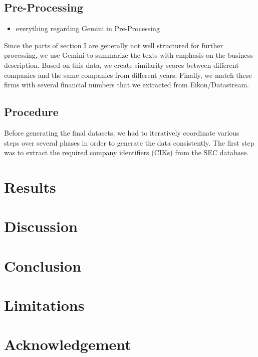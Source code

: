 \documentclass[
]{article}
\providecommand{\tightlist}{%
  \setlength{\itemsep}{0pt}\setlength{\parskip}{0pt}}\usepackage{longtable,booktabs,array}
\begin{document}
\subsection{Pre-Processing}\label{pre-processing}

\begin{itemize}
\tightlist
\item
  everything regarding Gemini in Pre-Processing
\end{itemize}

Since the parts of section I are generally not well structured for
further processing, we use Gemini to summarize the texts with emphasis
on the business description. Based on this data, we create similarity
scores between different companies and the same companies from different
years. Finally, we match these firms with several financial numbers that
we extracted from Eikon/Datastream.

\subsection{Procedure}\label{procedure}

Before generating the final datasets, we had to iteratively coordinate
various steps over several phases in order to generate the data
consistently. The first step was to extract the required company
identifiers (CIKs) from the SEC database.

\section{Results}\label{results}

\section{Discussion}\label{discussion}

\section{Conclusion}\label{conclusion}

\section{Limitations}\label{limitations}

\section{Acknowledgement}\label{acknowledgement}
\end{document}

